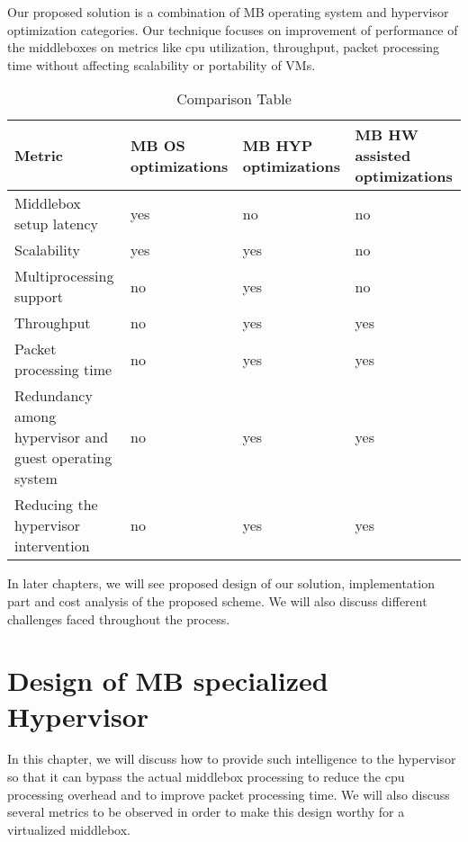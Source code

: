\documentclass[a4paper,11pt]{report}
\begin{document}
Our proposed solution is a combination of MB operating system and hypervisor optimization categories. Our technique focuses on improvement of performance of the middleboxes on metrics like cpu utilization, throughput, packet processing time without affecting scalability or portability of VMs.

\begin{table}[H]
\centering
\begin{tabular}{ | L{6.0cm} | C{2.5cm} | C{2.5cm} | C{2.5cm} | }
\hline
{\textbf {Metric}} & {\textbf {MB OS optimizations}} & {\textbf {MB HYP optimizations}} & {\textbf {MB HW assisted optimizations}}\\ %
\hline
\hline
{Middlebox setup latency} & {yes} & {no} & {no} \\ %
\hline
{Scalability}&{yes}&{yes}&{no}\\ %
\hline
{Multiprocessing support}&{no}&{yes}&{no}\\ %
\hline
{Throughput}&{no}&{yes}&{yes}\\ %
\hline
{Packet processing time}&{no}&{yes}&{yes}\\ %
\hline
{Redundancy among hypervisor and guest operating system}&{no}&{yes}&{yes}\\ %
\hline
{Reducing the hypervisor intervention} & {no} & {yes} & {yes} \\ %
\hline

\end{tabular}
\caption{Comparison Table}
\end{table}

\bigskip
In later chapters, we will see proposed design of our solution, implementation part and cost analysis of the proposed scheme. We will also discuss different challenges faced throughout the process.   

\chapter{Design of MB specialized Hypervisor}
In this chapter, we will discuss how to provide such intelligence to the hypervisor so that it can bypass the actual middlebox processing to reduce the cpu processing overhead and to improve packet processing time. We will also discuss several metrics to be observed in order to make this design worthy for a virtualized middlebox. 
\end{document}
